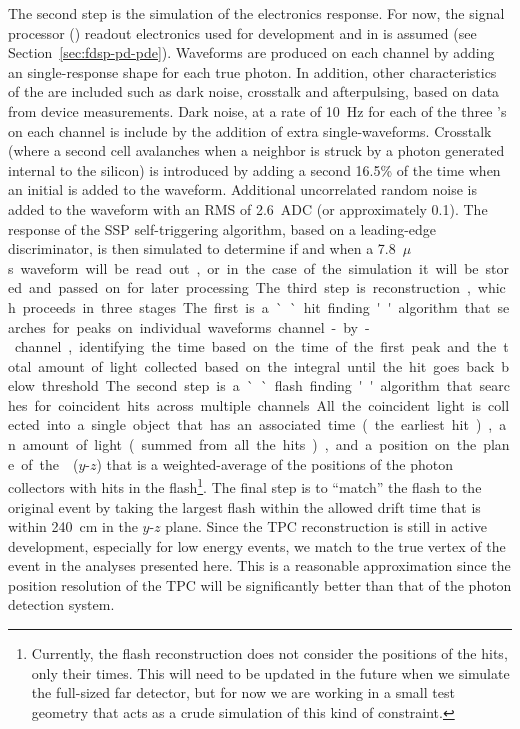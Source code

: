 The second step is the simulation of the electronics response. For now, the  signal processor () readout electronics used for  development and in  is assumed (see Section~\ref{sec:fdsp-pd-pde}). 
Waveforms are produced on each channel by adding an  single-\phel response shape for each true photon. In addition, other characteristics of the  are included such as dark noise, crosstalk and afterpulsing, based on data from device measurements. 
Dark noise, at a rate of \SI{10}{Hz} for each of the three 's on each channel is include by the addition of extra single-\phel waveforms. Crosstalk (where a second cell avalanches when a neighbor is struck by a photon generated internal to the silicon) is introduced by adding a second \phel \num{16.5}\% of the time when an initial \phel is added to the waveform. Additional uncorrelated random noise is added to the waveform with an RMS of \SI{2.6}{ADC} (or approximately \SI{0.1}{\phel}). The response of the SSP self-triggering algorithm, based on a leading-edge discriminator, is then simulated to determine if and when a \SI{7.8}{$\mu$s} waveform will be read out, or in the case of the simulation it will be stored and passed on for later processing.

The third step is reconstruction, which proceeds in three stages. The first is a ``hit finding'' algorithm that searches for peaks on individual waveforms channel-by-channel, identifying the time based on the time of the first peak and the total amount of light collected based on the integral until the hit goes back below threshold. The second step is a ``flash finding'' algorithm that searches for coincident hits across multiple channels. All the coincident light is collected into a single object that has an associated time (the earliest hit), an amount of light (summed from all the hits), and a position on the plane of the  ($y$-$z$) that is a weighted-average of the positions of the photon collectors with hits in the flash\footnote{Currently, the flash reconstruction does not consider the positions of the hits, only their times. 
This will need to be updated in the future when we simulate the full-sized far detector,  but for now we are working in a small test geometry that acts as a crude simulation of this kind of constraint.}. The final step is to ``match'' the flash to the original event by taking the largest flash within the allowed drift time that is within \SI{240}{cm} in the $y$-$z$ plane. Since the TPC reconstruction is still in active development, especially for low energy events, we match to the true  vertex of the event in the analyses presented here. This is a reasonable approximation since the position resolution of the TPC will be significantly better than that of the photon detection system. 

